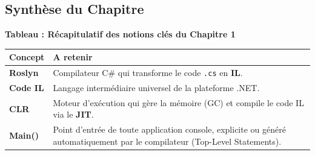 \subsection{Synthèse du Chapitre}

\begin{center}
    \textbf{Tableau : Récapitulatif des notions clés du Chapitre 1} \\[0.3cm]
    \begin{tabular}{@{}lp{10cm}@{}}
        \toprule
        \textbf{Concept} & \textbf{A retenir} \\
        \midrule
        \textbf{Roslyn} & Compilateur C\# qui transforme le code \texttt{.cs} en \textbf{IL}. \\
        \textbf{Code IL} & Langage intermédiaire universel de la plateforme .NET. \\
        \textbf{CLR} & Moteur d'exécution qui gère la mémoire (GC) et compile le code IL via le \textbf{JIT}. \\
        \textbf{Main()} & Point d'entrée de toute application console, explicite ou généré automatiquement par le compilateur (Top-Level Statements). \\
        \bottomrule
    \end{tabular}
\end{center}
